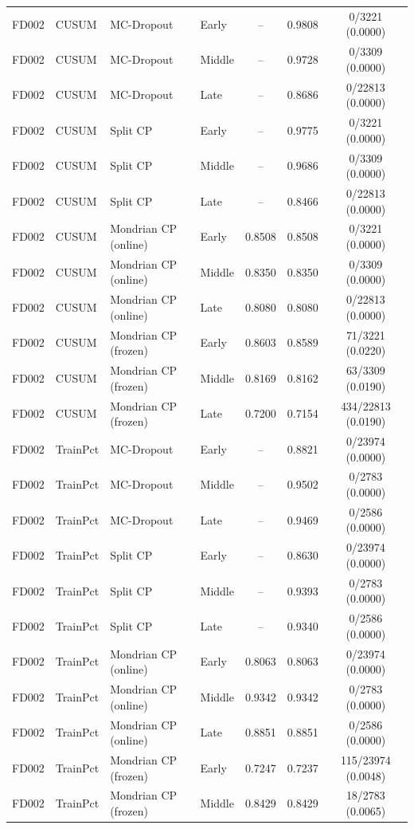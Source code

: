 \begin{table}[t]
\begin{tabular}{llllccc}
FD002 & CUSUM & MC-Dropout & Early & -- & 0.9808 & 0/3221 (0.0000) \\
FD002 & CUSUM & MC-Dropout & Middle & -- & 0.9728 & 0/3309 (0.0000) \\
FD002 & CUSUM & MC-Dropout & Late & -- & 0.8686 & 0/22813 (0.0000) \\
FD002 & CUSUM & Split CP & Early & -- & 0.9775 & 0/3221 (0.0000) \\
FD002 & CUSUM & Split CP & Middle & -- & 0.9686 & 0/3309 (0.0000) \\
FD002 & CUSUM & Split CP & Late & -- & 0.8466 & 0/22813 (0.0000) \\
FD002 & CUSUM & Mondrian CP (online) & Early & 0.8508 & 0.8508 & 0/3221 (0.0000) \\
FD002 & CUSUM & Mondrian CP (online) & Middle & 0.8350 & 0.8350 & 0/3309 (0.0000) \\
FD002 & CUSUM & Mondrian CP (online) & Late & 0.8080 & 0.8080 & 0/22813 (0.0000) \\
FD002 & CUSUM & Mondrian CP (frozen) & Early & 0.8603 & 0.8589 & 71/3221 (0.0220) \\
FD002 & CUSUM & Mondrian CP (frozen) & Middle & 0.8169 & 0.8162 & 63/3309 (0.0190) \\
FD002 & CUSUM & Mondrian CP (frozen) & Late & 0.7200 & 0.7154 & 434/22813 (0.0190) \\
FD002 & TrainPct & MC-Dropout & Early & -- & 0.8821 & 0/23974 (0.0000) \\
FD002 & TrainPct & MC-Dropout & Middle & -- & 0.9502 & 0/2783 (0.0000) \\
FD002 & TrainPct & MC-Dropout & Late & -- & 0.9469 & 0/2586 (0.0000) \\
FD002 & TrainPct & Split CP & Early & -- & 0.8630 & 0/23974 (0.0000) \\
FD002 & TrainPct & Split CP & Middle & -- & 0.9393 & 0/2783 (0.0000) \\
FD002 & TrainPct & Split CP & Late & -- & 0.9340 & 0/2586 (0.0000) \\
FD002 & TrainPct & Mondrian CP (online) & Early & 0.8063 & 0.8063 & 0/23974 (0.0000) \\
FD002 & TrainPct & Mondrian CP (online) & Middle & 0.9342 & 0.9342 & 0/2783 (0.0000) \\
FD002 & TrainPct & Mondrian CP (online) & Late & 0.8851 & 0.8851 & 0/2586 (0.0000) \\
FD002 & TrainPct & Mondrian CP (frozen) & Early & 0.7247 & 0.7237 & 115/23974 (0.0048) \\
FD002 & TrainPct & Mondrian CP (frozen) & Middle & 0.8429 & 0.8429 & 18/2783 (0.0065) \\

\end{tabular}
\end{table}
